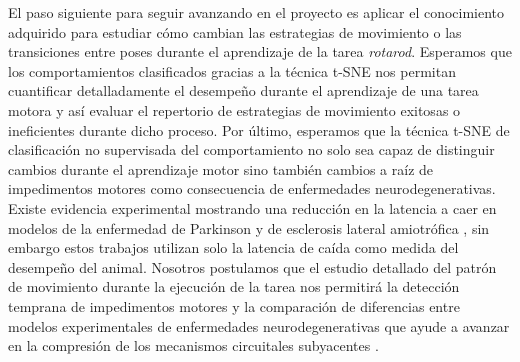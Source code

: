 El paso siguiente para seguir avanzando en el proyecto es aplicar el conocimiento adquirido para estudiar cómo cambian las estrategias de movimiento o las transiciones entre poses durante el aprendizaje de la tarea \textit{rotarod}. Esperamos que los comportamientos clasificados gracias a la técnica t-SNE nos permitan cuantificar detalladamente el desempeño durante el aprendizaje de una tarea motora y así evaluar el repertorio de estrategias de movimiento exitosas o ineficientes durante dicho proceso. Por último, esperamos que la técnica t-SNE de clasificación no supervisada del comportamiento no solo sea capaz de distinguir cambios durante el aprendizaje motor sino también cambios a raíz de impedimentos motores como consecuencia de enfermedades neurodegenerativas. Existe evidencia experimental mostrando una reducción en la latencia a caer en modelos de la enfermedad de Parkinson y de esclerosis lateral amiotrófica \cite{costa_motor_learning, campos_parkinson}, sin embargo estos trabajos utilizan solo la latencia de caída como medida del desempeño del animal. Nosotros postulamos que el estudio detallado del patrón de movimiento durante la ejecución de la tarea nos permitirá la detección temprana de impedimentos motores y la comparación de diferencias entre modelos experimentales de enfermedades neurodegenerativas que ayude a avanzar en la compresión de los mecanismos circuitales subyacentes \cite{alfieri_motor_deficit}.

\thispagestyle{empty}